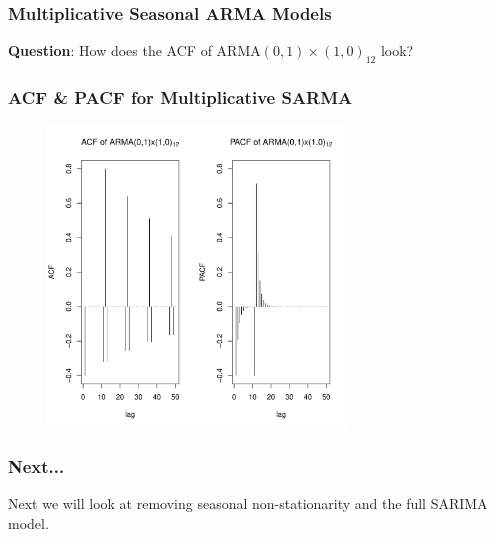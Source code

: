 \documentclass[%
xcolor=pdftex]{beamer}
\begin{document}
\begin{frame}
\frametitle{Multiplicative Seasonal ARMA Models}

\textbf{Question}: How does the ACF of ARMA$(0,1) \times (1,0)_{12}$ look?

\vspace{50mm}

\end{frame}

\begin{frame}
\frametitle{ACF \& PACF for Multiplicative SARMA}

\includegraphics[width=100mm, height=80mm]{arma_acf.pdf}

\end{frame}


\begin{frame}
\frametitle{Next...}

Next we will look at removing seasonal non-stationarity and the full SARIMA model.

\end{frame}
\end{document}
